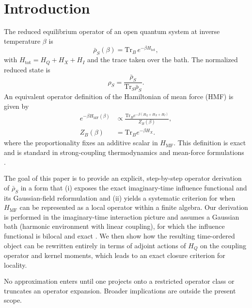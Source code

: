 \section{Introduction}
\label{sec:intro}

The reduced equilibrium operator of an open quantum system at inverse
temperature $\beta$ is
\begin{equation}
    \bar{\rho}_S(\beta) = \mathrm{Tr}_B \, e^{-\beta H_{\mathrm{tot}}},
    \label{eq:intro_rho_unnorm}
\end{equation}
with $H_{\mathrm{tot}} = H_Q + H_X + H_I$ and the trace taken over the bath.
The normalized reduced state is
\begin{equation}
    \rho_S = \frac{\bar{\rho}_S}{\mathrm{Tr}_S \bar{\rho}_S}.
    \label{eq:intro_rho_norm}
\end{equation}
An equivalent operator definition of the Hamiltonian of mean force (HMF) is
given by
\begin{align}
    e^{-\beta H_{\mathrm{MF}}(\beta)}
    &\propto \frac{\mathrm{Tr}_B e^{-\beta(H_Q+H_X+H_I)}}{Z_B(\beta)},
    \label{eq:intro_hmf_def} \\
    Z_B(\beta) &= \mathrm{Tr}_B e^{-\beta H_X}.
    \nonumber
\end{align}
where the proportionality fixes an additive scalar in $H_{\mathrm{MF}}$.
This definition is exact and is standard in strong-coupling thermodynamics
and mean-force formulations 
\cite{campisiFluctuationTheoremArbitrary2009,talknerColloquiumStatisticalMechanics2020,trushechkinOpenQuantumSystem2022,seifertFirstSecondLaw2016}.

The goal of this paper is to provide an explicit, step-by-step operator
derivation of $\bar{\rho}_S$ in a form that (i) exposes the exact
imaginary-time influence functional and its Gaussian-field reformulation and
(ii) yields a systematic criterion for when $H_{\mathrm{MF}}$ can be represented
as a local operator within a finite algebra.
Our derivation is performed in the imaginary-time interaction picture and
assumes a Gaussian bath (harmonic environment with linear coupling), for which
the influence functional is bilocal and exact
\cite{feynmanTheoryGeneralQuantum1963a,caldeiraQuantumTunnellingDissipative1983a,grabertQuantumBrownianMotion1988}.
We then show how the resulting time-ordered object can be rewritten entirely in
terms of adjoint actions of $H_Q$ on the coupling operator and kernel moments,
which leads to an exact closure criterion for locality.

No approximation enters until one projects onto a restricted operator class or
truncates an operator expansion. Broader implications are outside the present
scope.

